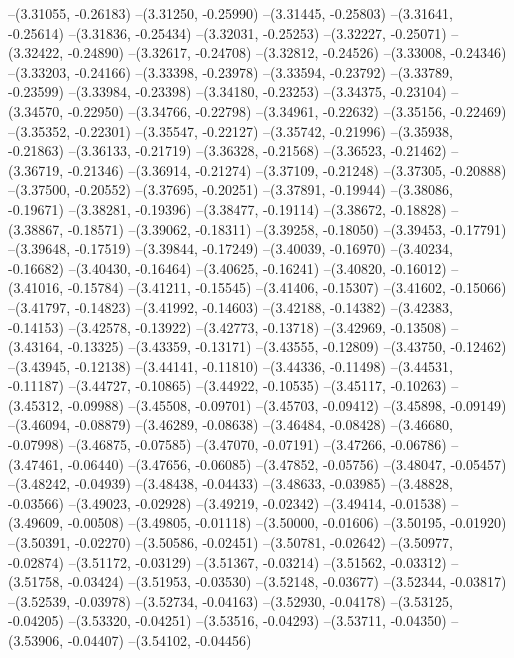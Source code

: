 --(3.31055, -0.26183)
--(3.31250, -0.25990)
--(3.31445, -0.25803)
--(3.31641, -0.25614)
--(3.31836, -0.25434)
--(3.32031, -0.25253)
--(3.32227, -0.25071)
--(3.32422, -0.24890)
--(3.32617, -0.24708)
--(3.32812, -0.24526)
--(3.33008, -0.24346)
--(3.33203, -0.24166)
--(3.33398, -0.23978)
--(3.33594, -0.23792)
--(3.33789, -0.23599)
--(3.33984, -0.23398)
--(3.34180, -0.23253)
--(3.34375, -0.23104)
--(3.34570, -0.22950)
--(3.34766, -0.22798)
--(3.34961, -0.22632)
--(3.35156, -0.22469)
--(3.35352, -0.22301)
--(3.35547, -0.22127)
--(3.35742, -0.21996)
--(3.35938, -0.21863)
--(3.36133, -0.21719)
--(3.36328, -0.21568)
--(3.36523, -0.21462)
--(3.36719, -0.21346)
--(3.36914, -0.21274)
--(3.37109, -0.21248)
--(3.37305, -0.20888)
--(3.37500, -0.20552)
--(3.37695, -0.20251)
--(3.37891, -0.19944)
--(3.38086, -0.19671)
--(3.38281, -0.19396)
--(3.38477, -0.19114)
--(3.38672, -0.18828)
--(3.38867, -0.18571)
--(3.39062, -0.18311)
--(3.39258, -0.18050)
--(3.39453, -0.17791)
--(3.39648, -0.17519)
--(3.39844, -0.17249)
--(3.40039, -0.16970)
--(3.40234, -0.16682)
--(3.40430, -0.16464)
--(3.40625, -0.16241)
--(3.40820, -0.16012)
--(3.41016, -0.15784)
--(3.41211, -0.15545)
--(3.41406, -0.15307)
--(3.41602, -0.15066)
--(3.41797, -0.14823)
--(3.41992, -0.14603)
--(3.42188, -0.14382)
--(3.42383, -0.14153)
--(3.42578, -0.13922)
--(3.42773, -0.13718)
--(3.42969, -0.13508)
--(3.43164, -0.13325)
--(3.43359, -0.13171)
--(3.43555, -0.12809)
--(3.43750, -0.12462)
--(3.43945, -0.12138)
--(3.44141, -0.11810)
--(3.44336, -0.11498)
--(3.44531, -0.11187)
--(3.44727, -0.10865)
--(3.44922, -0.10535)
--(3.45117, -0.10263)
--(3.45312, -0.09988)
--(3.45508, -0.09701)
--(3.45703, -0.09412)
--(3.45898, -0.09149)
--(3.46094, -0.08879)
--(3.46289, -0.08638)
--(3.46484, -0.08428)
--(3.46680, -0.07998)
--(3.46875, -0.07585)
--(3.47070, -0.07191)
--(3.47266, -0.06786)
--(3.47461, -0.06440)
--(3.47656, -0.06085)
--(3.47852, -0.05756)
--(3.48047, -0.05457)
--(3.48242, -0.04939)
--(3.48438, -0.04433)
--(3.48633, -0.03985)
--(3.48828, -0.03566)
--(3.49023, -0.02928)
--(3.49219, -0.02342)
--(3.49414, -0.01538)
--(3.49609, -0.00508)
--(3.49805, -0.01118)
--(3.50000, -0.01606)
--(3.50195, -0.01920)
--(3.50391, -0.02270)
--(3.50586, -0.02451)
--(3.50781, -0.02642)
--(3.50977, -0.02874)
--(3.51172, -0.03129)
--(3.51367, -0.03214)
--(3.51562, -0.03312)
--(3.51758, -0.03424)
--(3.51953, -0.03530)
--(3.52148, -0.03677)
--(3.52344, -0.03817)
--(3.52539, -0.03978)
--(3.52734, -0.04163)
--(3.52930, -0.04178)
--(3.53125, -0.04205)
--(3.53320, -0.04251)
--(3.53516, -0.04293)
--(3.53711, -0.04350)
--(3.53906, -0.04407)
--(3.54102, -0.04456)
